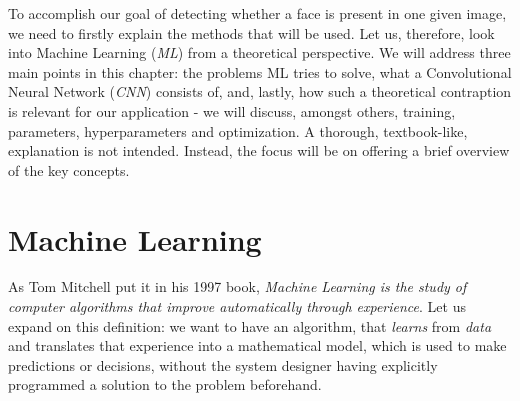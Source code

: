 To accomplish our goal of detecting whether a face is present in one given image, we need to firstly explain the methods that will be used. Let us, therefore, look into Machine Learning (\textit{ML}) from a theoretical perspective. We will address three main points in this chapter: the problems ML tries to solve, what a Convolutional Neural Network (\textit{CNN}) consists of, and, lastly, how such a theoretical contraption is relevant for our application - we will discuss, amongst others, training, parameters, hyperparameters and optimization. A thorough, textbook-like, explanation is not intended. Instead, the focus will be on offering a brief overview of the key concepts.
\section{Machine Learning}
As Tom Mitchell put it in his 1997 book, \textit{Machine Learning is the study of computer algorithms that improve automatically through experience}. \cite{mitchell_ml} Let us expand on this definition: we want to have an algorithm, that \textit{learns} from \textit{data} and translates that experience into a mathematical model, which is used to make predictions or decisions, without the system designer having explicitly programmed a solution to the problem beforehand. \cite{genetic_book_96} \par

